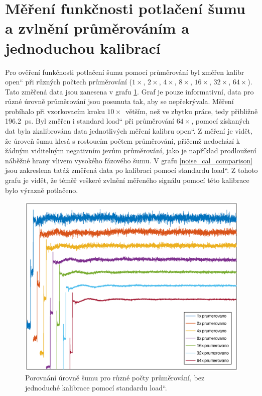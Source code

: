 \section{Měření funkčnosti potlačení šumu a zvlnění průměrováním a jednoduchou kalibrací}
Pro ověření funkčnosti potlačení šumu pomocí průměrování byl změřen kalibr \quotedblbase open\textquotedblleft{} při různých počtech průměrování ($1\times$, $2\times$, $4\times$, $8\times$, $16\times$, $32\times$, $64\times$). Tato změřená data jsou zanesena v grafu \ref{noise_raw_comparison}. Graf je pouze informativní, data pro různé úrovně průměrování jsou posunuta tak, aby se nepřekrývala. Měření probíhalo při vzorkovacím kroku $10\times$~větším, než ve zbytku práce, tedy přibližně \SI{196.2}{\pico\second}. Byl změřen i standard \quotedblbase load\textquotedblleft{} při průměrování $64\times$, pomocí získaných dat byla zkalibrována data jednotlivých měření kalibru \quotedblbase open\textquotedblleft . Z měření je vidět, že úroveň šumu klesá s rostoucím počtem průměrování, přičemž nedochází k žádným viditelným negativním jevům průměrování, jako je například prodloužení náběžné hrany vlivem vysokého fázového šumu. V grafu \ref{noise_cal_comparison} jsou zakreslena tatáž změřená data po kalibraci pomocí standardu \quotedblbase load\textquotedblleft . Z tohoto grafu je vidět, že téměř veškeré zvlnění měřeného signálu pomocí této kalibrace bylo výrazně potlačeno.

\begin{figure}[htbp]
\includegraphics[width=\textwidth,keepaspectratio]{images/noise_raw_comparison.eps}\caption{Porovnání úrovně šumu pro různé počty průměrování, bez jednoduché kalibrace pomocí standardu \quotedblbase load\textquotedblleft .}\label{noise_raw_comparison}
\end{figure}

